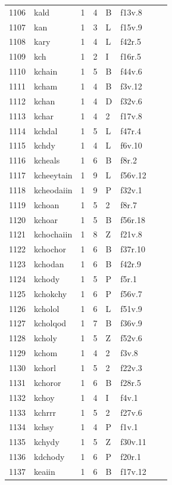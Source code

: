 \documentclass[11pt,a4paper]{article}
\begin{document}
\begin{landscape}
\begin{longtable}{@{}r>{\ttfamily}lrrl>{\ttfamily}l>{\raggedright\arraybackslash}p{80mm}>{\raggedright\arraybackslash}p{36mm}@{}}
1106 & kald & 1 & 4 & B & f13v.8 &  & \\
1107 & kan & 1 & 3 & L & f15v.9 &  & \\
1108 & kary & 1 & 4 & L & f42r.5 &  & \\
1109 & kch & 1 & 2 & I & f16r.5 &  & \\
1110 & kchain & 1 & 5 & B & f44v.6 &  & \\
1111 & kcham & 1 & 4 & B & f3v.12 &  & \\
1112 & kchan & 1 & 4 & D & f32v.6 &  & \\
1113 & kchar & 1 & 4 & 2 & f17v.8 &  & \\
1114 & kchdal & 1 & 5 & L & f47r.4 &  & \\
1115 & kchdy & 1 & 4 & L & f6v.10 &  & \\
1116 & kcheals & 1 & 6 & B & f8r.2 &  & \\
1117 & kcheeytain & 1 & 9 & L & f56v.12 &  & \\
1118 & kcheodaiin & 1 & 9 & P & f32v.1 &  & \\
1119 & kchoan & 1 & 5 & 2 & f8r.7 &  & \\
1120 & kchoar & 1 & 5 & B & f56r.18 &  & \\
1121 & kchochaiin & 1 & 8 & Z & f21v.8 &  & \\
1122 & kchochor & 1 & 6 & B & f37r.10 &  & \\
1123 & kchodan & 1 & 6 & B & f42r.9 &  & \\
1124 & kchody & 1 & 5 & P & f5r.1 &  & \\
1125 & kchokchy & 1 & 6 & P & f56v.7 &  & \\
1126 & kcholol & 1 & 6 & L & f51v.9 &  & \\
1127 & kcholqod & 1 & 7 & B & f36v.9 &  & \\
1128 & kcholy & 1 & 5 & Z & f52v.6 &  & \\
1129 & kchom & 1 & 4 & 2 & f3v.8 &  & \\
1130 & kchorl & 1 & 5 & 2 & f22v.3 &  & \\
1131 & kchoror & 1 & 6 & B & f28r.5 &  & \\
1132 & kchoy & 1 & 4 & I & f4v.1 &  & \\
1133 & kchrrr & 1 & 5 & 2 & f27v.6 &  & \\
1134 & kchsy & 1 & 4 & P & f1v.1 &  & \\
1135 & kchydy & 1 & 5 & Z & f30v.11 &  & \\
1136 & kdchody & 1 & 6 & P & f20r.1 &  & \\
1137 & keaiin & 1 & 6 & B & f17v.12 &  & \\

\end{longtable}
\end{landscape}
\end{document}
